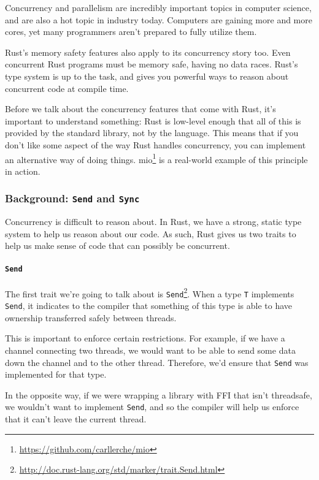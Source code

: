 \documentclass[a4paper,]{book}
\renewcommand{\href}[2]{#2\footnote{\url{#1}}}
\begin{document}
Concurrency and parallelism are incredibly important topics in computer
science, and are also a hot topic in industry today. Computers are
gaining more and more cores, yet many programmers aren't prepared to
fully utilize them.

Rust's memory safety features also apply to its concurrency story too.
Even concurrent Rust programs must be memory safe, having no data races.
Rust's type system is up to the task, and gives you powerful ways to
reason about concurrent code at compile time.

Before we talk about the concurrency features that come with Rust, it's
important to understand something: Rust is low-level enough that all of
this is provided by the standard library, not by the language. This
means that if you don't like some aspect of the way Rust handles
concurrency, you can implement an alternative way of doing things.
\href{https://github.com/carllerche/mio}{mio} is a real-world example of
this principle in action.

\subsubsection{\texorpdfstring{Background: \texttt{Send} and
\texttt{Sync}}{Background: Send and Sync}}\label{background-send-and-sync}

Concurrency is difficult to reason about. In Rust, we have a strong,
static type system to help us reason about our code. As such, Rust gives
us two traits to help us make sense of code that can possibly be
concurrent.

\paragraph{\texorpdfstring{\texttt{Send}}{Send}}\label{send}

The first trait we're going to talk about is
\href{http://doc.rust-lang.org/std/marker/trait.Send.html}{\texttt{Send}}.
When a type \texttt{T} implements \texttt{Send}, it indicates to the
compiler that something of this type is able to have ownership
transferred safely between threads.

This is important to enforce certain restrictions. For example, if we
have a channel connecting two threads, we would want to be able to send
some data down the channel and to the other thread. Therefore, we'd
ensure that \texttt{Send} was implemented for that type.

In the opposite way, if we were wrapping a library with FFI that isn't
threadsafe, we wouldn't want to implement \texttt{Send}, and so the
compiler will help us enforce that it can't leave the current thread.
\end{document}
